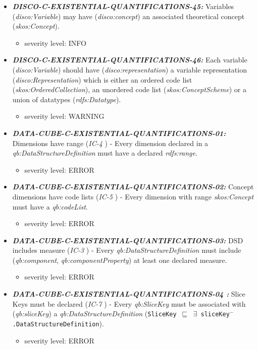 \documentclass{llncs}
\newcommand{\ms}[1]{\texttt{#1}}
\begin{document}
\begin{itemize}
\begin{itemize}
	\end{itemize}
	\item \textbf{{\em DISCO-C-EXISTENTIAL-QUANTIFICATIONS-45:}} 
  Variables (\emph{disco:Variable}) may have (\emph{disco:concept}) an associated theoretical concept (\emph{skos:Concept}).
	\begin{itemize}
		\item severity level: INFO
	\end{itemize}
	\item \textbf{{\em DISCO-C-EXISTENTIAL-QUANTIFICATIONS-46:}} 
  Each variable (\emph{disco:Variable}) should have (\emph{disco:representation}) a variable representation (\emph{disco:Representation}) which is either an ordered code list (\emph{skos:OrderedCollection}), an unordered code list (\emph{skos:ConceptScheme}) or a union of datatypes (\emph{rdfs:Datatype}).
	\begin{itemize}
		\item severity level: WARNING
	\end{itemize}
\end{itemize}

\begin{itemize}
	\item \textbf{{\em DATA-CUBE-C-EXISTENTIAL-QUANTIFICATIONS-01:}}
	Dimensions have range (\emph{IC-4} \cite{CyganiakReynolds2014}) - 
	Every dimension declared in a \emph{qb:DataStructureDefinition} must have a declared \emph{rdfs:range}. 
	\begin{itemize}
		\item severity level: ERROR
	\end{itemize}
	\item \textbf{{\em DATA-CUBE-C-EXISTENTIAL-QUANTIFICATIONS-02:}}
	Concept dimensions have code lists (\emph{IC-5} \cite{CyganiakReynolds2014}) - 
	Every dimension with range \emph{skos:Concept} must have a \emph{qb:codeList}. 
	\begin{itemize}
		\item severity level: ERROR
	\end{itemize}
  \item \textbf{{\em DATA-CUBE-C-EXISTENTIAL-QUANTIFICATIONS-03:}}
	DSD includes measure (\emph{IC-3} \cite{CyganiakReynolds2014}) -  
	Every \emph{qb:DataStructureDefinition} must include (\emph{qb:component}, \emph{qb:componentProperty}) at least one declared measure. 
	\begin{itemize}
		\item severity level: ERROR
	\end{itemize}
	\item \textbf{{\em DATA-CUBE-C-EXISTENTIAL-QUANTIFICATIONS-04	:}}
	Slice Keys must be declared (\emph{IC-7} \cite{CyganiakReynolds2014}) -
	Every \emph{qb:SliceKey} must be associated with (\emph{qb:sliceKey}) a \emph{qb:DataStructureDefinition} (\ms{SliceKey $\sqsubseteq$ $\exists$ sliceKey$^{-}$.DataStructureDefinition}). 
	\begin{itemize}
		\item severity level: ERROR
	\end{itemize}
\end{itemize}
\end{document}
